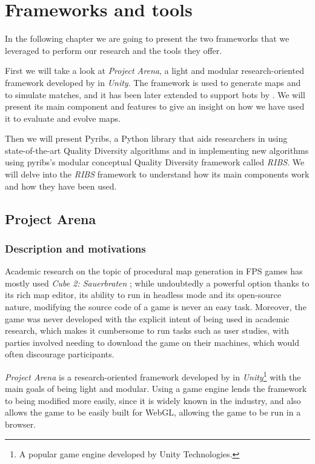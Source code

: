 
\chapter{Frameworks and tools}
\label{ch:tools}
In the following chapter we are going to present the two frameworks that we leveraged to perform our research and the tools they offer.

First we will take a look at \textit{Project Arena}, a light and modular research-oriented framework developed by \citeauthor{ballabio_online_2018} in \textit{Unity}. The framework is used to generate maps and to simulate matches, and it has been later extended to support bots by \citeauthor{bari_evolutionary-based_2023}. We will present its main component and features to give an insight on how we have used it to evaluate and evolve maps.

Then we will present Pyribs, a Python library that aids researchers in using state-of-the-art Quality Diversity algorithms and in implementing new algorithms using pyribs's modular conceptual Quality Diversity framework called \textit{RIBS}. We will delve into the \textit{RIBS} framework to understand how its main components work and how they have been used.

\section{Project Arena}
\label{ch:project_arena}


\subsection{Description and motivations}
\label{sec:pa_description}
Academic research on the topic of procedural map generation in FPS games has mostly used \textit{Cube 2: Sauerbraten} \cite{cardamone_evolving_2011}\cite{lanzi_evolving_2014}\cite{loiacono_fight_2017}; while undoubtedly a powerful option thanks to its rich map editor, its ability to run in headless mode and its open-source nature, modifying the source code of a game is never an easy task. Moreover, the game was never developed with the explicit intent of being used in academic research, which makes it cumbersome to run tasks such as user studies, with parties involved needing to download the game on their machines, which would often discourage participants.

\textit{Project Arena} \cite{ballabio_online_2018} is a research-oriented framework developed by \citeauthor{ballabio_online_2018} in \textit{Unity}\footnote{A popular game engine developed by Unity Technologies.} with the main goals of being light and modular. Using a game engine lends the framework to being modified more easily, since it is widely known in the industry, and also allows the game to be easily built for WebGL, allowing the game to be run in a browser. 

